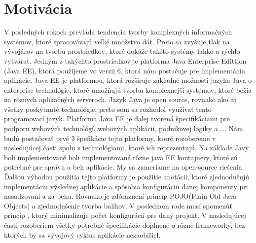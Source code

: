 \section{Motivácia}
V posledných rokoch prevláda tendencia tvorby komplexných informačných systémov, ktoré spracovávajú veľké množstvo dát. Preto sa zvyšuje tlak na vývojárov na tvorbu prostriedkov, ktoré dokáže takéto systémy ľahko a rýchlo vytvárať. Jedným z takýchto prostriedkov je platforma Java Enterprise Edittion (Java EE), ktorá použijeme vo verzii 6, ktorá nám postačuje pre implementáciu aplikácie. Java EE je platformou, ktorá rozširuje základné možnosti jazyka Java o enterprise technológie, ktoré umožňujú tvorbu komplexnejší systémov, ktoré bežia na rôznych aplikačných serveroch. Jazyk Java je open source, rovnako ako aj všetky poskytnuté technológie, preto som sa rozhodol využívať tento programovací jazyk. Platforma Java EE je ďalej tvorená špecifikáciami pre podporu webových technológí, webových aplikácií, podnikovej logiky a \ldots. Nám budú postačovať prvé 3 špefikácie tejto platformy, ktoré rozobereme v nasledujúcej časti spolu s technológiami, ktoré ich reprezentujú. Na základe Javy boli implementované boli implementované rôzne java EE kontajnery, ktoré sú potrebné pre správu a beh aplikácie. My sa zameriame na open-source riešenia. Ďalšou výhodou použitia tejto platformy je použitie anotácií, ktoré zjednodušujú implementáciu výslednej aplikácie a spôsobia konfiguráciu danej komponenty pri nasadzovaní a za behu. Rovnako je zdôraznení princíp POJO(Plain Old Java Objects)\cite{pojobook} a zjednodušenie tvorba balíkov. V poslednom rade musí spomenúť princíp , ktorý minimalizuje počet konfigurácií pre daný projekt. V nasledujúcej časti rozoberiem všetky potrebné špecifikácie doplnené o rôzne frameworky, bez ktorých by sa vývojový cyklus aplikácie nezaobišiel.


